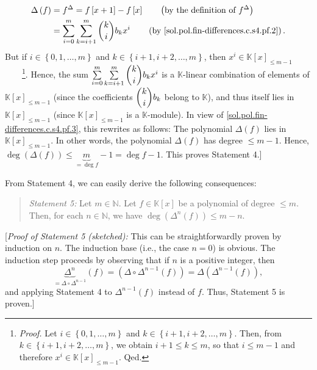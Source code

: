 \documentclass[paper=a4, fontsize=12pt]{scrartcl}%
\let\sumnonlimits\sum
\renewcommand{\sum}{\sumnonlimits\limits}
\theoremstyle{plainsl}
\theoremstyle{definition}
\theoremstyle{remark}
\newenvironment{statement}{\begin{quote}}{\end{quote}}
\begin{document}
\begin{align}
\Delta\left(  f\right)   &  =f^{\Delta}=f\left[  x+1\right]  -f\left[
x\right]  \qquad\left(  \text{by the definition of }f^{\Delta}\right)
\nonumber\\
&  =\sum_{i=0}^{m}\sum_{k=i+1}^{m}\dbinom{k}{i}b_{k}x^{i}\qquad\left(
\text{by \eqref{sol.pol.fin-differences.c.s4.pf.2}}\right)  .
\label{sol.pol.fin-differences.c.s4.pf.3}%
\end{align}
But if $i\in\left\{  0,1,\ldots,m\right\}  $ and $k\in\left\{  i+1,i+2,\ldots
,m\right\}  $, then $x^{i}\in\mathbb{K}\left[  x\right]  _{\leq m-1}%
$\ \ \ \ \footnote{\textit{Proof.} Let $i\in\left\{  0,1,\ldots,m\right\}  $
and $k\in\left\{  i+1,i+2,\ldots,m\right\}  $. Then, from $k\in\left\{
i+1,i+2,\ldots,m\right\}  $, we obtain $i+1\leq k\leq m$, so that $i\leq m-1$
and therefore $x^{i}\in\mathbb{K}\left[  x\right]  _{\leq m-1}$. Qed.}. Hence,
the sum $\sum_{i=0}^{m}\sum_{k=i+1}^{m}\dbinom{k}{i}b_{k}x^{i}$ is a
$\mathbb{K}$-linear combination of elements of $\mathbb{K}\left[  x\right]
_{\leq m-1}$ (since the coefficients $\dbinom{k}{i}b_{k}$ belong to
$\mathbb{K}$), and thus itself lies in $\mathbb{K}\left[  x\right]  _{\leq
m-1}$ (since $\mathbb{K}\left[  x\right]  _{\leq m-1}$ is a $\mathbb{K}%
$-module). In view of \eqref{sol.pol.fin-differences.c.s4.pf.3}, this rewrites
as follows: The polynomial $\Delta\left(  f\right)  $ lies in $\mathbb{K}%
\left[  x\right]  _{\leq m-1}$. In other words, the polynomial $\Delta\left(
f\right)  $ has degree $\leq m-1$. Hence, $\deg\left(  \Delta\left(  f\right)
\right)  \leq\underbrace{m}_{=\deg f}-1=\deg f-1$. This proves Statement 4.]

\bigskip

From Statement 4, we can easily derive the following consequences:

\begin{statement}
\textit{Statement 5:} Let $m\in\mathbb{N}$. Let $f\in\mathbb{K}\left[
x\right]  $ be a polynomial of degree $\leq m$. Then, for each $n\in
\mathbb{N}$, we have $\deg\left(  \Delta^{n}\left(  f\right)  \right)  \leq
m-n$.
\end{statement}

[\textit{Proof of Statement 5 (sketched):} This can be straightforwardly
proven by induction on $n$. The induction base (i.e., the case $n=0$) is
obvious. The induction step proceeds by observing that if $n$ is a positive
integer, then%
\[
\underbrace{\Delta^{n}}_{=\Delta\circ\Delta^{n-1}}\left(  f\right)  =\left(
\Delta\circ\Delta^{n-1}\left(  f\right)  \right)  =\Delta\left(  \Delta
^{n-1}\left(  f\right)  \right)  ,
\]
and applying Statement 4 to $\Delta^{n-1}\left(  f\right)  $ instead of $f$.
Thus, Statement 5 is proven.]
\end{document}

